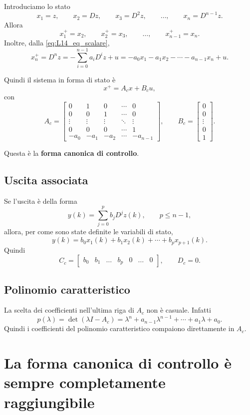 Introduciamo lo stato
\[
x_1=z,\qquad
x_2=Dz,\qquad
x_3=D^2z,\qquad \dots,\qquad
x_n=D^{n-1}z.
\]
Allora
\[
x_1^+=x_2,\qquad
x_2^+=x_3,\qquad
\dots,\qquad
x_{n-1}^+=x_n.
\]
Inoltre, dalla \eqref{eq:L14_eq_scalare},
\[
x_n^+=D^n z
=
-\sum_{i=0}^{n-1} a_i D^i z + u
=
-a_0x_1-a_1x_2-\cdots-a_{n-1}x_n+u.
\]

Quindi il sistema in forma di stato è
\[
x^+=A_cx+B_cu,
\]
con
\[
A_c=
\begin{bmatrix}
0 & 1 & 0 & \cdots & 0\\
0 & 0 & 1 & \cdots & 0\\
\vdots & \vdots & \vdots & \ddots & \vdots\\
0 & 0 & 0 & \cdots & 1\\
-a_0 & -a_1 & -a_2 & \cdots & -a_{n-1}
\end{bmatrix},
\qquad
B_c=
\begin{bmatrix}
0\\0\\\vdots\\0\\1
\end{bmatrix}.
\]

Questa è la \textbf{forma canonica di controllo}.

\subsection{Uscita associata}

Se l’uscita è della forma
\[
y(k)=\sum_{j=0}^{p} b_j D^j z(k),
\qquad p\le n-1,
\]
allora, per come sono state definite le variabili di stato,
\[
y(k)=b_0x_1(k)+b_1x_2(k)+\cdots+b_p x_{p+1}(k).
\]
Quindi
\[
C_c=
\begin{bmatrix}
b_0 & b_1 & \dots & b_p & 0 & \dots & 0
\end{bmatrix},
\qquad
D_c=0.
\]

\subsection{Polinomio caratteristico}

La scelta dei coefficienti nell’ultima riga di \(A_c\) non è casuale.  
Infatti
\[
p(\lambda)=\det(\lambda I-A_c)
=
\lambda^n+a_{n-1}\lambda^{n-1}+\cdots+a_1\lambda+a_0.
\]
Quindi i coefficienti del polinomio caratteristico compaiono direttamente in \(A_c\).

\section{La forma canonica di controllo è sempre completamente raggiungibile}

